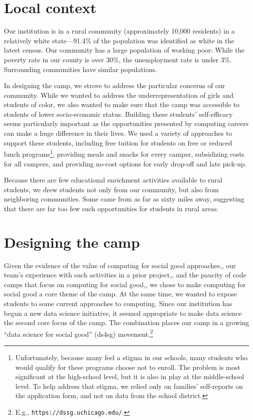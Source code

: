 \section{Local context}

Our institution is in a rural community (approximately 10,000
residents) in a relatively white state---91.4\% of the population was
identified as white in the latest census.  Our community has a large
population of working poor: While the poverty rate in our county
is over 30\%, the unemployment rate is under 3\%.  Surrounding
communities have similar populations.

In designing the camp, we strove to address the particular concerns
of our community.  While we wanted to address the underrepresentation
of girls and students of color, we also wanted to make sure that
the camp was accessible to students of lower socio-economic status.
Building these students' self-efficacy seems particularly important
as the opportunities presented by computing careers can make a huge
difference in their lives.  We used a variety of approaches to
support these students, including free tuition for students on free
or reduced lunch programs\footnote{Unfortunately, because many feel
a stigma in our schools, many students who would qualify for these
programs choose not to enroll.  The problem is most significant at
the high-school level, but it is also in play at the
middle-school level.  To help address that stigma, we relied only
on families' self-reports on the application form, and not on data
from the school district.}, providing meals and snacks for every
camper, subsidizing costs for all campers, and providing no-cost
options for early drop-off and late pick-up.

Because there are few educational enrichment activities available
to rural students, we drew students not only from our community,
but also from neighboring communities.  Some came from as far as
sixty miles away, suggesting that there are far too few such
opportunities for students in rural areas.

\section{Designing the camp}

Given the evidence of the value of computing for social good
approaches,\cite{Goldweber2013,Goldweber2018}, our team's experience
with such activities in a prior project,\cite{arts-coding}, and the
paucity of code camps that focus on computing for social
good,\cite{DeWitt2017}, we chose to make
computing for social good a core theme of the camp.  At the same
time, we wanted to expose students to some current approaches to
computing.  Since our institution has begun a new data science
initiative, it seemed appropriate to make data science the second
core focus of the camp.  The combination places our camp in a growing
``data science for social good'' (ds4sg) movement.\footnote{E.g.,
\texttt{https://dssg.uchicago.edu/}.}

